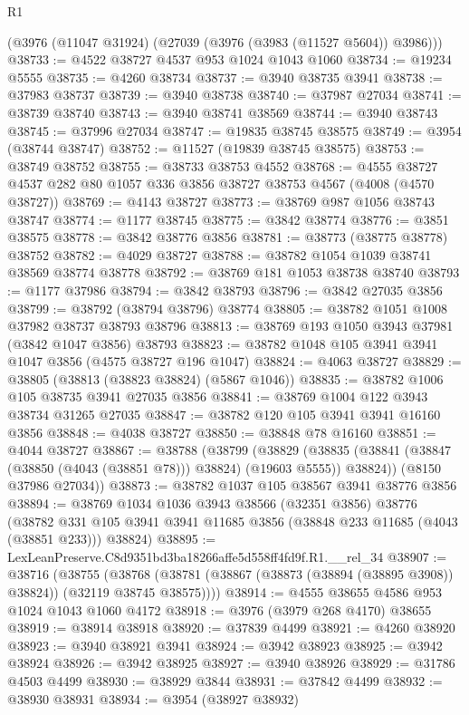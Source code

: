 \begin{lexlean}{R1}
\begin{coremodule}
    (@3976 (@11047 @31924) (@27039 (@3976 (@3983 (@11527 @5604)) @3986)))
@38733 := @4522 @38727 @4537 @953 @1024 @1043 @1060
@38734 := @19234 @5555
@38735 := @4260 @38734
@38737 := @3940 @38735 @3941
@38738 := @37983 @38737
@38739 := @3940 @38738
@38740 := @37987 @27034
@38741 := @38739 @38740
@38743 := @3940 @38741 @38569
@38744 := @3940 @38743
@38745 := @37996 @27034
@38747 := @19835 @38745 @38575
@38749 := @3954 (@38744 @38747)
@38752 := @11527 (@19839 @38745 @38575)
@38753 := @38749 @38752
@38755 := @38733 @38753 @4552
@38768 := @4555 @38727 @4537 @282 @80 @1057 @336 @3856 @38727 @38753 @4567 (@4008 (@4570 @38727))
@38769 := @4143 @38727
@38773 := @38769 @987 @1056 @38743 @38747
@38774 := @1177 @38745
@38775 := @3842 @38774
@38776 := @3851 @38575
@38778 := @3842 @38776 @3856
@38781 := @38773 (@38775 @38778) @38752
@38782 := @4029 @38727
@38788 := @38782 @1054 @1039 @38741 @38569 @38774 @38778
@38792 := @38769 @181 @1053 @38738 @38740
@38793 := @1177 @37986
@38794 := @3842 @38793
@38796 := @3842 @27035 @3856
@38799 := @38792 (@38794 @38796) @38774
@38805 := @38782 @1051 @1008 @37982 @38737 @38793 @38796
@38813 := @38769 @193 @1050 @3943 @37981 (@3842 @1047 @3856) @38793
@38823 := @38782 @1048 @105 @3941 @3941 @1047 @3856 (@4575 @38727 @196 @1047)
@38824 := @4063 @38727
@38829 := @38805 (@38813 (@38823 @38824) (@5867 @1046))
@38835 := @38782 @1006 @105 @38735 @3941 @27035 @3856
@38841 := @38769 @1004 @122 @3943 @38734 @31265 @27035
@38847 := @38782 @120 @105 @3941 @3941 @16160 @3856
@38848 := @4038 @38727
@38850 := @38848 @78 @16160
@38851 := @4044 @38727
@38867 := @38788
    (@38799
      (@38829 (@38835 (@38841 (@38847 (@38850 (@4043 (@38851 @78))) @38824) (@19603 @5555)) @38824))
      (@8150 @37986 @27034))
@38873 := @38782 @1037 @105 @38567 @3941 @38776 @3856
@38894 := @38769
    @1034
    @1036
    @3943
    @38566
    (@32351 @3856)
    @38776
    (@38782 @331 @105 @3941 @3941 @11685 @3856 (@38848 @233 @11685 (@4043 (@38851 @233))) @38824)
@38895 := LexLeanPreserve.C8d9351bd3ba18266affe5d558ff4fd9f.R1.__rel_34
@38907 := @38716
    (@38755
      (@38768 (@38781 (@38867 (@38873 (@38894 (@38895 @3908)) @38824)) (@32119 @38745 @38575))))
@38914 := @4555 @38655 @4586 @953 @1024 @1043 @1060 @4172
@38918 := @3976 (@3979 @268 @4170) @38655
@38919 := @38914 @38918
@38920 := @37839 @4499
@38921 := @4260 @38920
@38923 := @3940 @38921 @3941
@38924 := @3942 @38923
@38925 := @3942 @38924
@38926 := @3942 @38925
@38927 := @3940 @38926
@38929 := @31786 @4503 @4499
@38930 := @38929 @3844
@38931 := @37842 @4499
@38932 := @38930 @38931
@38934 := @3954 (@38927 @38932)

\end{coremodule}
\end{lexlean}
